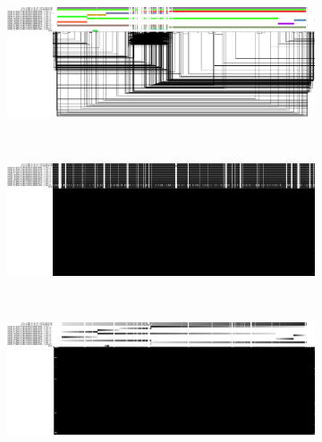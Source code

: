 \begin{figure}[!htpb]
	\centering
	\begin{subfigure}{1.0\textwidth}
		\centering
		\caption{}
		\includegraphics[width=1.0\linewidth, trim=0cm 2.5cm 0cm 0cm]{fig/1D/chr6.hprc-v1.0-pggb.13paths.MHC.og.png}
		\label{fig:1d_fig1}
	\end{subfigure}
	\\
	\begin{subfigure}{1.0\textwidth}
		\centering
		\caption{}
		\includegraphics[width=1.0\linewidth, trim=0cm 2.5cm 0cm 0cm]{fig/1D/chr6.hprc-v1.0-pggb.13paths.MHC.og.r.og.png}
		\label{fig:1d_fig2}
	\end{subfigure}
	\\
	\begin{subfigure}{1.0\textwidth}
		\centering
		\caption{}
		\includegraphics[width=1.0\linewidth, trim=0cm 2.5cm 0cm 0cm]{fig/1D/chr6.hprc-v1.0-pggb.13paths.MHC.og.r.og.Y.og.png}
		\label{fig:1d_fig3}
	\end{subfigure}
	\\
	\begin{subfigure}{1.0\textwidth}

\end{subfigure}
\end{figure}
